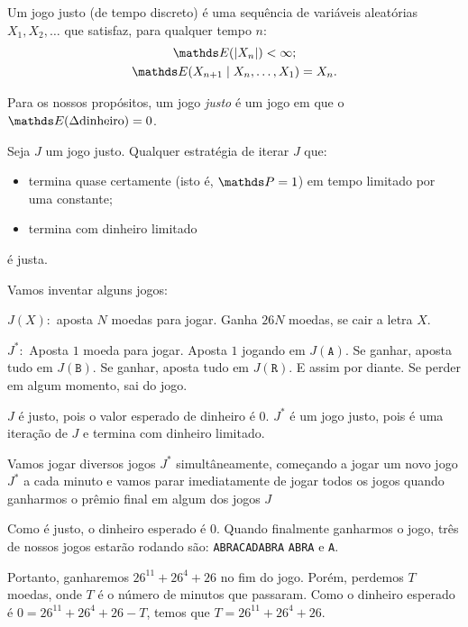 \documentclass[10pt,a4paper]{article}
\begin{document}
	\begin{defn}
		Um jogo justo (de tempo discreto) é uma sequência de variáveis aleatórias $X_1, X_2, \dots$ que satisfaz, para qualquer tempo $n$:
		\begin{gather*}
			\EE(|X_n|) < \infty;\\
			\EE(X_{n+1} \mid X_n, \dots, X_1) = X_n.
		\end{gather*}
	\end{defn}

	\begin{cor}
	Para os nossos propósitos, um jogo \emph{justo} é um jogo em que o $\EE(\Delta\text{dinheiro}) = 0$.
	\end{cor}

	\begin{thm}
		Seja $J$ um jogo justo. Qualquer estratégia de iterar $J$ que:
		\begin{itemize}
			\item termina quase certamente (isto é, $\PP = 1$) em tempo limitado por uma constante;
			\item termina com dinheiro limitado
		\end{itemize}
		é justa.
	\end{thm}


	\begin{sol}
		Vamos inventar alguns jogos:

		$J(X):$ aposta $N$ moedas para jogar. Ganha $26N$ moedas, se cair a letra $X$.

		$J^*:$ Aposta $1$ moeda para jogar. Aposta $1$ jogando em $J(\mathtt{A})$. Se ganhar, aposta tudo em $J(\mathtt{B})$. Se ganhar, aposta tudo em $J(\mathtt{R})$. E assim por diante. Se perder em algum momento, sai do jogo.

		$J$ é justo, pois o valor esperado de dinheiro é 0. $J^*$ é um jogo justo, pois é uma iteração de $J$ e termina com dinheiro limitado.

		Vamos jogar diversos jogos $J^*$ simultâneamente, começando a jogar um novo jogo $J^*$ a cada minuto e vamos parar imediatamente de jogar todos os jogos quando ganharmos o prêmio final em algum dos jogos $J$

		Como é justo, o dinheiro esperado é $0$. Quando finalmente ganharmos o jogo, três de nossos jogos estarão rodando são: \texttt{ABRACADABRA} \texttt{ABRA} e \texttt{A}.

		Portanto, ganharemos $26^{11} + 26^4 + 26$ no fim do jogo. Porém, perdemos $T$ moedas, onde $T$ é o número de minutos que passaram. Como o dinheiro esperado é $0 = 26^{11} + 26^4 + 26 - T$, temos que $T = 26^{11} + 26^4 + 26$.
	\end{sol}
\end{document}
